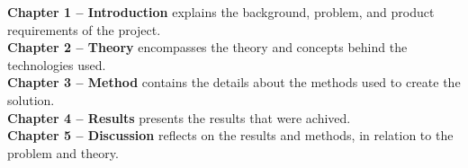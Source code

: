 












\textbf{Chapter 1 -- Introduction} explains the background, problem, and product requirements of the project.\\

\noindent\textbf{Chapter 2 -- Theory} encompasses the theory and concepts behind the technologies used.\\

\noindent\textbf{Chapter 3 -- Method} contains the details about the methods used to create the solution.\\

\noindent\textbf{Chapter 4 -- Results} presents the results that were achived.\\

\noindent\textbf{Chapter 5 -- Discussion} reflects on the results and methods, in relation to the problem and theory.\\

